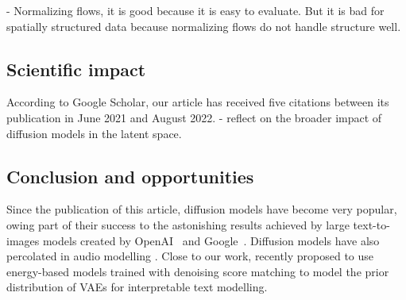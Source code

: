 - Normalizing flows, it is good because it is easy to evaluate. But it is bad for spatially structured data because normalizing flows do not handle structure well.
\subsection{Scientific impact}

According to Google Scholar, our article has received five citations between its publication in June 2021 and August 2022.
- reflect on the broader impact of diffusion models in the latent space.

\subsection{Conclusion and opportunities}
Since the publication of this article, diffusion models have become very popular, owing part of their success to the astonishing results achieved by large text-to-images models created by OpenAI~\citep[$\text{DALL}\cdot\text{E } 2$][]{ramesh2022hierarchical} and Google~\citep[Imagen][]{saharia2022photorealistic}. Diffusion models have also percolated in audio modelling \citep{kong2020diffwave}. Close to our work, \citet{yu2022latent} recently proposed to use energy-based models trained with denoising score matching to model the prior distribution of VAEs for interpretable text modelling.


